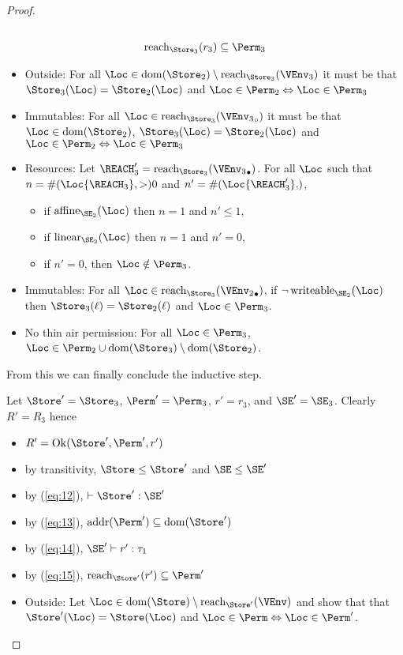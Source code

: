 \begin{proof}
\begin{gather}
    \\\label{eq:15}
    \Reach{\Store_3}{r_3} \subseteq \Perm_3
  \end{gather}
  \begin{itemize}
  \item Outside: For all $\Loc \in \Dom{\Store_2} \setminus
    \Reach{\Store_3}{\VEnv_3}$ it must be that 
    $\Store_3(\Loc) = \Store_2 (\Loc)$
    and $\Loc\in\Perm_2 \Leftrightarrow \Loc\in\Perm_3$ 
  \item Immutables: For all $\Loc \in
    \Reach{\Store_3}{\ImmutableBorrows{\VEnv_3}}$ it must be that
    $\Loc\in\Dom{\Store_2}$, 
    $\Store_3 (\Loc) = \Store_2 (\Loc)$
    and $\Loc\in{\Perm_2} \Leftrightarrow \Loc\in\Perm_3$ 
  \item Resources:
    Let $\REACH_3' =\Reach{\Store_3}{\Active{\VEnv_3}}$.
    For all $\Loc$ such that $n= \MultiNumber\Loc{\REACH_3} >0$ and $n' =
    \MultiNumber\Loc{\REACH_3'}$, 
    \begin{itemize}
    \item if $\Affine{\SE_2}\Loc$ then $n=1$ and $n'\le 1$,
    \item if $\Linear{\SE_2}\Loc$ then $n=1$ and $n' = 0$,
    \item if $n'=0$, then $\Loc\notin\Perm_3$.
    \end{itemize}
  \item Immutables: For all $\Loc \in \Reach
    {\Store_3}{\Active{\VEnv_2}}$, if $\neg\Writeable{\SE_2}\Loc$ then
    $\Store_3 (\ell) = \Store_2 (\ell)$ and $\Loc\in \Perm_3$.
  \item No thin air permission: For all $\Loc\in \Perm_3$, $\Loc
    \in \Perm_2 \cup  \Dom{\Store_3} \setminus \Dom{\Store_2}$.
  \end{itemize}
  From this we can finally conclude the inductive step.

  Let $\Store' = \Store_3$, $\Perm' = \Perm_3$, $r' = r_3$, and $\SE'
  = \SE_3$. Clearly $R' = R_3$ hence
  \begin{itemize}
  \item $R' = \Ok{\Store', \Perm', r'}$
  \item by transitivity, $\Store \le \Store'$ and $\SE \le \SE'$
  \item by (\ref{eq:12}), $\vdash \Store' : \SE'$
  \item by (\ref{eq:13}), $\Addresses{\Perm'} \subseteq \Dom{\Store'}$
  \item by (\ref{eq:14}), $\SE' \vdash r' : \tau_1$
  \item by (\ref{eq:15}), $\Reach{\Store'}{r'} \subseteq \Perm'$
  \item Outside: Let $\Loc \in \Dom{\Store} \setminus
    \Reach{\Store'}{\VEnv}$ and show that that 
    $\Store' (\Loc) = \Store (\Loc)$
    and $\Loc\in\Perm \Leftrightarrow \Loc\in\Perm'$.


\end{itemize}
\end{proof}
